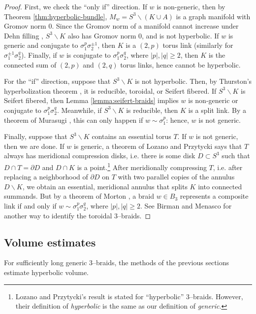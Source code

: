 \documentclass[11pt]{amsart}
\renewcommand{\setminus}{{\smallsetminus}}
\theoremstyle{plain}
\theoremstyle{definition}
\begin{document}
\begin{proof}
First, we check the ``only if'' direction.  If $w$ is non-generic,
then by Theorem \ref{thm:hyperbolic-bundle}, $M_w = S^3 \setminus (K
\cup A)$ is a graph manifold with Gromov norm 0.  Since the Gromov
norm of a manifold cannot increase under Dehn filling
\cite[Proposition 6.5.2]{thurston:notes}, $S^3 \setminus K$ also has
Gromov norm 0, and is not hyperbolic.  If $w$ is generic and conjugate
to $\sigma_1^p \sigma_2^{\pm 1}$, then $K$ is a $(2,p)$ torus link
(similarly for $\sigma_1^{\pm 1} \sigma_2^{q}$).  Finally, if $w$ is
conjugate to $\sigma_1^p \sigma_2^q$, where $|p|, |q| \geq 2$, then
$K$ is the connected sum of $(2,p)$ and $(2,q)$ torus links, hence
cannot be hyperbolic.

For the ``if'' direction, suppose that $S^3 \setminus K$ is not
hyperbolic.  Then, by Thurston's hyperbolization theorem
\cite{thurston:survey}, it is reducible, toroidal, or Seifert fibered.
If $S^3\setminus K$ is Seifert fibered, then Lemma
\ref{lemma:seifert-braids} implies $w$ is non-generic or conjugate to
$\sigma_1^p \sigma_2^{q}$.  Meanwhile, if $S^3 \setminus K$ is reducible,
then $K$ is a split link.  By a theorem of Murasugi \cite[Theorem
5.1]{murasugi:3braids}, this can only happen if $w \sim \sigma_1^p$:
hence, $w$ is not generic.

Finally, suppose that $S^3 \setminus K$ contains an essential torus
$T$.  If $w$ is not generic, then we are done.  If $w$ is generic, a
theorem of Lozano and Przytycki \cite[Corollary 3.3]{lozano-przytycki}
says that $T$ always has meridional compression disks, i.e. there is
some disk $D \subset S^3$ such that $D\cap T = \partial D$ and $D\cap
K$ is a point.\protect\footnote{Lozano and Przytycki's result is
stated for ``hyperbolic'' 3--braids. However, their definition of
\emph{hyperbolic} is the same as our definition of \emph{generic}.}
After meridionally compressing $T$, i.e. after replacing a
neighborhood of $\partial D$ on $T$ with two parallel copies of the
annulus $D\setminus K$, we obtain an essential, meridional annulus
that splits $K$ into connected summands.  But by a theorem of Morton
\cite{morton:composite-braids}, a braid $w \in B_3$ represents a
composite link if and only if $w \sim \sigma_1^p \sigma_2^q$, where
$|p|, |q| \geq 2$. See Birman and Menasco \cite[Corollary 1]{birman-menasco:toroidal}
for another way to identify the toroidal $3$--braids.
\end{proof}

\subsection{Volume estimates}
For sufficiently long generic $3$--braids, the methods of the previous
sections estimate hyperbolic volume.
\end{document}
